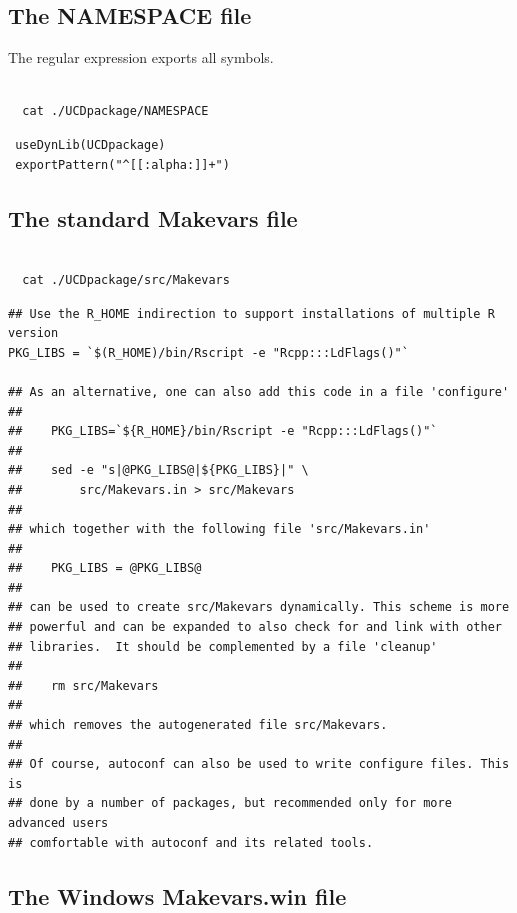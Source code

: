 \documentclass[11pt]{article}
\begin{document}
\subsection{The NAMESPACE file}
\label{sec-8-7}


The regular expression exports all symbols.


\begin{verbatim}
  
  cat ./UCDpackage/NAMESPACE
\end{verbatim}

\begin{verbatim}
 useDynLib(UCDpackage)
 exportPattern("^[[:alpha:]]+")
\end{verbatim}
\subsection{The standard Makevars file}
\label{sec-8-8}



\begin{verbatim}
  
  cat ./UCDpackage/src/Makevars
\end{verbatim}


\begin{verbatim}
## Use the R_HOME indirection to support installations of multiple R version
PKG_LIBS = `$(R_HOME)/bin/Rscript -e "Rcpp:::LdFlags()"`

## As an alternative, one can also add this code in a file 'configure'
##
##    PKG_LIBS=`${R_HOME}/bin/Rscript -e "Rcpp:::LdFlags()"`
## 
##    sed -e "s|@PKG_LIBS@|${PKG_LIBS}|" \
##        src/Makevars.in > src/Makevars
## 
## which together with the following file 'src/Makevars.in'
##
##    PKG_LIBS = @PKG_LIBS@
##
## can be used to create src/Makevars dynamically. This scheme is more
## powerful and can be expanded to also check for and link with other
## libraries.  It should be complemented by a file 'cleanup'
##
##    rm src/Makevars
##
## which removes the autogenerated file src/Makevars. 
##
## Of course, autoconf can also be used to write configure files. This is
## done by a number of packages, but recommended only for more advanced users
## comfortable with autoconf and its related tools.
\end{verbatim}
\subsection{The Windows Makevars.win file}
\label{sec-8-9}
\end{document}
